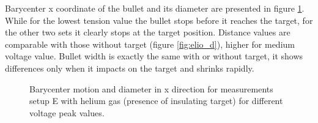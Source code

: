 Barycenter x coordinate of the bullet and its diameter are presented in figure \ref{fig:elio_c_xb}. While for the lowest tension value the bullet stops before it reaches the target, for the other two sets it clearly stops at the target position. Distance values are comparable with those without target (figure \ref{fig:elio_d}), higher for medium voltage value.
Bullet width is exactly the same with or without target, it shows differences only when it impacts on the target and shrinks rapidly.
\begin{figure}
 \centering
 \hfill
 \caption{Barycenter motion and diameter in x direction for measurements setup E with helium gas (presence of insulating target) for different voltage peak values.}
 \label{fig:elio_c_xb}
\end{figure}

